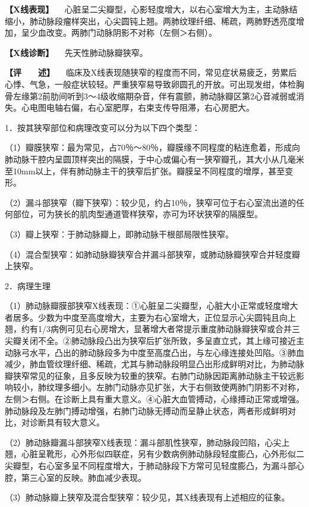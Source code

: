 \textbf{【X线表现】}
　心脏呈二尖瓣型，心影轻度增大，以右心室增大为主，主动脉结缩小，肺动脉段瘤样突出，心尖圆钝上翘。两肺纹理纤细、稀疏，两肺野透亮度增加，呈少血改变。两肺门动脉阴影不对称（左侧＞右侧）。

\textbf{【X线诊断】} 　先天性肺动脉瓣狭窄。

\textbf{【评　　述】}
　临床及X线表现随狭窄的程度而不同，常见症状易疲乏，劳累后心悸、气急，一般症状较轻。严重狭窄易导致卵圆孔的开放。可出现发绀，体检胸骨左缘第2前肋间听到3～4级收缩期杂音，伴有震颤，肺动脉瓣区第2心音减弱或消失。心电图电轴右偏，右心室肥厚，右束支传导阻滞，右心房肥大。

1．按其狭窄部位和病理改变可以分为以下四个类型：

（1）瓣膜狭窄：最为常见，占70％～80％，瓣膜缘不同程度的粘连愈着，形成向肺动脉干腔内呈圆顶样突出的隔膜，于中心或偏心有一狭窄瓣孔，其大小从几毫米至10mm以上，伴有肺动脉主干的狭窄后扩张。瓣膜呈不同程度的增厚，甚至变形。

（2）漏斗部狭窄（瓣下狭窄）：较少见，约占10％，狭窄可位于右心室流出道的任何部位，可为狭长的肌肉型通道管样狭窄，亦可为环状狭窄的隔膜型。

（3）瓣上狭窄：于肺动脉瓣上，即肺动脉干根部局限性狭窄。

（4）混合型狭窄：如肺动脉瓣狭窄合并漏斗部狭窄，或肺动脉瓣狭窄合并轻度瓣上狭窄。

2．病理生理

（1）肺动脉瓣膜部狭窄X线表现：①心脏呈二尖瓣型，心脏大小正常或轻度增大者居多。少数为中度至高度增大，主要为右心室增大，正位显示心尖圆钝且向上翘，约有1/3病例可见右心房增大，显著增大者常提示重度肺动脉瓣狭窄或合并三尖瓣关闭不全。②肺动脉段凸出为狭窄后扩张所致，多呈直立式，其上缘可接近主动脉弓水平，凸出的肺动脉段多为中度至高度凸出，与左心缘连接处凹陷。③肺血减少，肺血管纹理纤细、稀疏，尤其与肺动脉段明显凸出形成鲜明对比，为肺动脉瓣狭窄常见的征象，且多反映为较重的狭窄。右肺门动脉因距离肺动脉主干较远影响较小，肺纹理多细小。左肺门动脉亦见扩张，大于右侧致使两肺门阴影不对称，左侧＞右侧。在诊断上具有重大意义。④心脏大血管搏动，心缘搏动正常或增强。肺动脉段及左肺门搏动增强，右肺门动脉无搏动而呈静止状态，两者形成鲜明对比，对诊断具有较大意义。

（2）肺动脉瓣漏斗部狭窄X线表现：漏斗部肌性狭窄，肺动脉段凹陷，心尖上翘，心脏呈靴形，心外形似四联症，另有少数病例肺动脉段轻度膨凸，心外形似二尖瓣型，右心室多呈不同程度增大，于肺动脉段下方常可见轻度膨凸，为漏斗部心腔，第三心室的反映。肺血减少表现。

（3）肺动脉瓣上狭窄及混合型狭窄：较少见，其X线表现有上述相应的征象。

